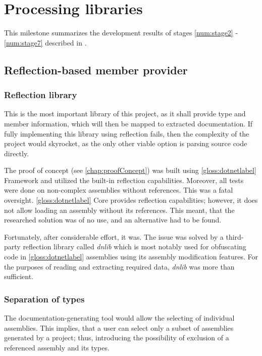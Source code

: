 \chapter{Processing libraries}

This milestone summarizes the development results of stages \ref{num:stage2} - \ref{num:stage7} described in .

\section{Reflection-based member provider}

\subsection{Reflection library}

This is the most important library of this project, as it shall provide type and member information, which will then be mapped to extracted documentation. If fully implementing this library using reflection fails, then the complexity of the project would skyrocket, as the only other viable option is parsing source code directly.

The proof of concept (see \ref{chap:proofConcept}) was built using \ref{gloss:dotnetlabel} Framework and utilized the built-in reflection capabilities. Moreover, all tests were done on non-complex assemblies without references. This was a fatal oversight. \ref{gloss:dotnetlabel} Core provides reflection capabilities; however, it does not allow loading an assembly without its references. This meant, that the researched solution was of no use, and an alternative had to be found.

Fortunately, after considerable effort, it was. The issue was solved by a third-party reflection library called \textit{dnlib} which is most notably used for obfuscating code in \ref{gloss:dotnetlabel} assemblies using its assembly modification features. For the purposes of reading and extracting required data, \textit{dnlib} was more than sufficient.

\subsection{Separation of types}

The documentation-generating tool would allow the selecting of individual assemblies. This implies, that a user can select only a subset of assemblies generated by a project; thus, introducing the possibility of exclusion of a referenced assembly and its types.

